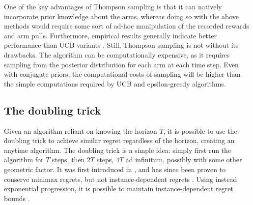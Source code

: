 One of the key advantages of Thompson sampling is that it can natively incorporate prior knowledge about the arms, whereas doing so with the above methods would require some sort of ad-hoc manipulation of the recorded rewards and arm pulls.
Furthermore, empirical results generally indicate better performance than UCB variants \cite{kaufmann2012}.
Still, Thompson sampling is not without its drawbacks.
The algorithm can be computationally expensive, as it requires sampling from the posterior distribution for each arm at each time step.
Even with conjugate priors, the computational costs of sampling will be higher than the simple computations required by UCB and epsilon-greedy algorithms.

\subsection{The doubling trick}
Given an algorithm reliant on knowing the horizon $T$, it is possible to use the doubling trick to achieve similar regret regardless of the horizon, creating an anytime algorithm.
The doubling trick is a simple idea: simply first run the algorithm for $T$ steps, then $2T$ steps, $4T$ ad infinitum, possibly with some other geometric factor.
It was first introduced in \cite{auer1995}, and has since been proven to conserve minimax regrets, but not instance-dependent regrets \cite{besson2018}.
Using instead exponential progression, it is possible to maintain instance-dependent regret bounds \cite{besson2018}.